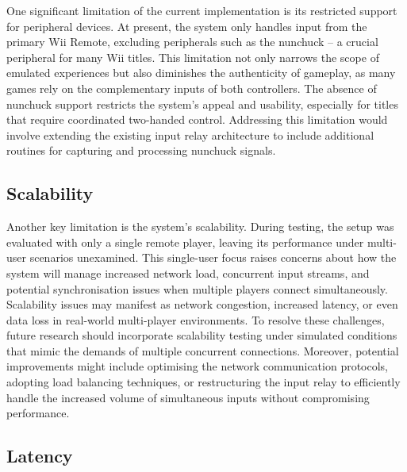 One significant limitation of the current implementation is its restricted
support for peripheral devices. At present, the system only handles input from
the primary Wii Remote, excluding peripherals such as the nunchuck -- a crucial peripheral for many Wii
titles. This limitation not only narrows the scope of emulated experiences but
also diminishes the authenticity of gameplay, as many games rely on the
complementary inputs of both controllers. The absence of nunchuck support
restricts the system’s appeal and usability, especially for titles that require
coordinated two-handed control. Addressing this limitation would involve extending
the existing input relay architecture to include additional routines for
capturing and processing nunchuck signals.

\subsection{Scalability}

Another key limitation is the system’s scalability. During testing, the setup
was evaluated with only a single remote player, leaving its performance under
multi-user scenarios unexamined. This single-user focus raises concerns about
how the system will manage increased network load, concurrent input streams, and
potential synchronisation issues when multiple players connect simultaneously.
Scalability issues may manifest as network congestion, increased latency, or
even data loss in real-world multi-player environments. To resolve these
challenges, future research should incorporate scalability testing under
simulated conditions that mimic the demands of multiple concurrent connections.
Moreover, potential improvements might include optimising the network
communication protocols, adopting load balancing techniques, or restructuring
the input relay to efficiently handle the increased volume of simultaneous
inputs without compromising performance.

\subsection{Latency}


